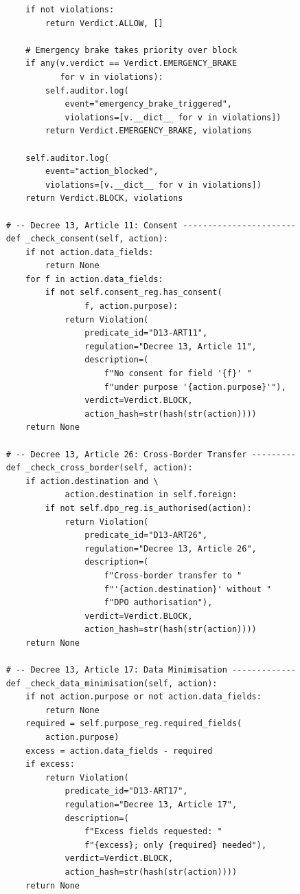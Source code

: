 \begin{lstlisting}
        if not violations:
            return Verdict.ALLOW, []

        # Emergency brake takes priority over block
        if any(v.verdict == Verdict.EMERGENCY_BRAKE
               for v in violations):
            self.auditor.log(
                event="emergency_brake_triggered",
                violations=[v.__dict__ for v in violations])
            return Verdict.EMERGENCY_BRAKE, violations

        self.auditor.log(
            event="action_blocked",
            violations=[v.__dict__ for v in violations])
        return Verdict.BLOCK, violations

    # -- Decree 13, Article 11: Consent -----------------------
    def _check_consent(self, action):
        if not action.data_fields:
            return None
        for f in action.data_fields:
            if not self.consent_reg.has_consent(
                    f, action.purpose):
                return Violation(
                    predicate_id="D13-ART11",
                    regulation="Decree 13, Article 11",
                    description=(
                        f"No consent for field '{f}' "
                        f"under purpose '{action.purpose}'"),
                    verdict=Verdict.BLOCK,
                    action_hash=str(hash(str(action))))
        return None

    # -- Decree 13, Article 26: Cross-Border Transfer ---------
    def _check_cross_border(self, action):
        if action.destination and \
                action.destination in self.foreign:
            if not self.dpo_reg.is_authorised(action):
                return Violation(
                    predicate_id="D13-ART26",
                    regulation="Decree 13, Article 26",
                    description=(
                        f"Cross-border transfer to "
                        f"'{action.destination}' without "
                        f"DPO authorisation"),
                    verdict=Verdict.BLOCK,
                    action_hash=str(hash(str(action))))
        return None

    # -- Decree 13, Article 17: Data Minimisation -------------
    def _check_data_minimisation(self, action):
        if not action.purpose or not action.data_fields:
            return None
        required = self.purpose_reg.required_fields(
            action.purpose)
        excess = action.data_fields - required
        if excess:
            return Violation(
                predicate_id="D13-ART17",
                regulation="Decree 13, Article 17",
                description=(
                    f"Excess fields requested: "
                    f"{excess}; only {required} needed"),
                verdict=Verdict.BLOCK,
                action_hash=str(hash(str(action))))
        return None


\end{lstlisting}
